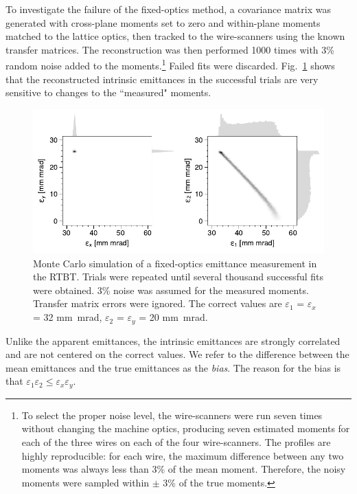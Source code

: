 To investigate the failure of the fixed-optics method, a covariance matrix was generated with cross-plane moments set to zero and within-plane moments matched to the lattice optics, then tracked to the wire-scanners using the known transfer matrices. The reconstruction was then performed 1000 times with 3\% random noise added to the moments.\footnote{To select the proper noise level, the wire-scanners were run seven times without changing the machine optics, producing seven estimated moments for each of the three wires on each of the four wire-scanners. The profiles are highly reproducible: for each wire, the maximum difference between any two moments was always less than 3\% of the mean moment. Therefore, the noisy moments were sampled within $\pm$ 3\% of the true moments.} Failed fits were discarded. Fig.~\ref{fig:prod_sensitivity} shows that the reconstructed intrinsic emittances in the successful trials are very sensitive to changes to the ``measured" moments. 
%
\begin{figure}[!p]
    \vspace*{5cm}
    \includegraphics[width=\textwidth]{Images/chapter4/prod_sensitivity.pdf}
    \caption{Monte Carlo simulation of a fixed-optics emittance measurement in the RTBT. Trials were repeated until several thousand successful fits were obtained. 3\% noise was assumed for the measured moments. Transfer matrix errors were ignored. The correct values are $\varepsilon_1$ = $\varepsilon_x$ = 32 mm~mrad, $\varepsilon_2$ = $\varepsilon_y$ = 20 mm~mrad.}
    \label{fig:prod_sensitivity}
    \vspace*{5cm}
\end{figure}
%
Unlike the apparent emittances, the intrinsic emittances are strongly correlated and are not centered on the correct values. We refer to the difference between the mean emittances and the true emittances as the \textit{bias}. The reason for the bias is that $\varepsilon_1\varepsilon_2 \le \varepsilon_x\varepsilon_y$.


